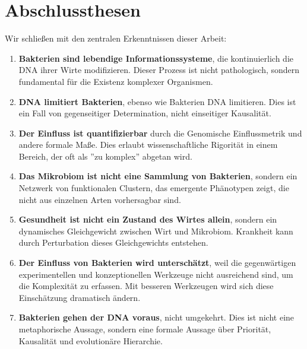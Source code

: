 \documentclass[a4paper,12pt]{article}
\theoremstyle{definition}
\begin{document}
\section{Abschlussthesen}


Wir schließen mit den zentralen Erkenntnissen dieser Arbeit:

\begin{enumerate}
    \item \textbf{Bakterien sind lebendige Informationssysteme}, die kontinuierlich die DNA ihrer Wirte modifizieren. Dieser Prozess ist nicht pathologisch, sondern fundamental für die Existenz komplexer Organismen.
    
    \item \textbf{DNA limitiert Bakterien}, ebenso wie Bakterien DNA limitieren. Dies ist ein Fall von gegenseitiger Determination, nicht einseitiger Kausalität.
    
    \item \textbf{Der Einfluss ist quantifizierbar} durch die Genomische Einflussmetrik und andere formale Maße. Dies erlaubt wissenschaftliche Rigorität in einem Bereich, der oft als ''zu komplex'' abgetan wird.
    
    \item \textbf{Das Mikrobiom ist nicht eine Sammlung von Bakterien}, sondern ein Netzwerk von funktionalen Clustern, das emergente Phänotypen zeigt, die nicht aus einzelnen Arten vorhersagbar sind.
    
    \item \textbf{Gesundheit ist nicht ein Zustand des Wirtes allein}, sondern ein dynamisches Gleichgewicht zwischen Wirt und Mikrobiom. Krankheit kann durch Perturbation dieses Gleichgewichts entstehen.
    
    \item \textbf{Der Einfluss von Bakterien wird unterschätzt}, weil die gegenwärtigen experimentellen und konzeptionellen Werkzeuge nicht ausreichend sind, um die Komplexität zu erfassen. Mit besseren Werkzeugen wird sich diese Einschätzung dramatisch ändern.
    
    \item \textbf{Bakterien gehen der DNA voraus}, nicht umgekehrt. Dies ist nicht eine metaphorische Aussage, sondern eine formale Aussage über Priorität, Kausalität und evolutionäre Hierarchie.
\end{enumerate}
\end{document}
